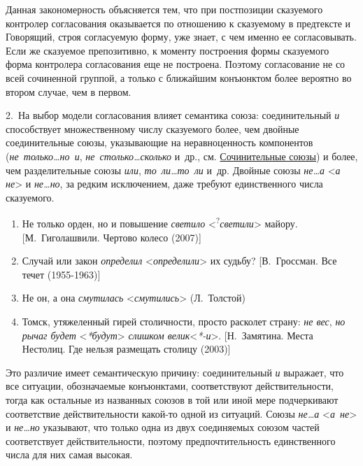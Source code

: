 Данная закономерность объясняется тем, что при постпозиции сказуемого
контролер согласования оказывается по отношению к сказуемому в
предтексте и Говорящий, строя согласуемую форму, уже знает, с чем именно
ее согласовывать. Если же сказуемое препозитивно, к моменту построения
формы сказуемого форма контролера согласования еще не построена. Поэтому
согласование не со всей сочиненной группой, а только с ближайшим
конъюнктом более вероятно во втором случае, чем в первом.

2.~На выбор модели согласования влияет семантика союза: соединительный
\textit{и} способствует множественному числу сказуемого более, чем двойные
соединительные союзы, указывающие на неравноценность компонентов
(\textit{не~только\ldots но~и}, \textit{не~столько\ldots сколько} и~др., см.
\underline{Сочинительные союзы}) и более, чем разделительные союзы
\textit{или}, \textit{то~ли\ldots то~ли} и~др. Двойные союзы
\textit{не\ldots а} \textless{}\textit{а не}\textgreater{} и
\textit{не\ldots но}, за редким исключением, даже требуют единственного
числа сказуемого.

\begin{enumerate}
  \def\labelenumi{(\arabic{enumi})}
  \setcounter{enumi}{101}
  \item
        Не только орден, но и повышение \textit{светило}
        \textless{}\textsuperscript{?}\textit{светили}\textgreater{} майору.
        {[}М.~Гиголашвили. Чертово колесо (2007){]}
  \item
        Случай или закон \textit{определил}
        \textless*\textit{определили}\textgreater{} их судьбу? {[}В.~Гроссман.
        Все течет (1955-1963){]}
  \item
        Не он, а она \textit{смутилась} \textless*\textit{смутились}\textgreater{}
        (Л.~Толстой)
  \item
        Томск, утяжеленный гирей столичности, просто расколет страну: \textit{не
          вес}, \textit{но рычаг будет} \textless{}\textit{*будут}\textgreater{}
        \textit{слишком велик}\textless{}\textit{*-и}\textgreater. {[}Н.~Замятина.
        Места Нестолиц. Где нельзя размещать столицу (2003){]}
\end{enumerate}

Это различие имеет семантическую причину: соединительный \textit{и}
выражает, что все ситуации, обозначаемые конъюнктами, соответствуют
действительности, тогда как остальные из названных союзов в той или иной
мере подчеркивают соответствие действительности какой-то одной из
ситуаций. Союзы \textit{не\ldots а} \textless{}\textit{а~не}\textgreater{} и
\textit{не\ldots но} указывают, что только одна из двух соединяемых союзом
частей соответствует действительности, поэтому предпочтительность
единственного числа для них самая высокая.

